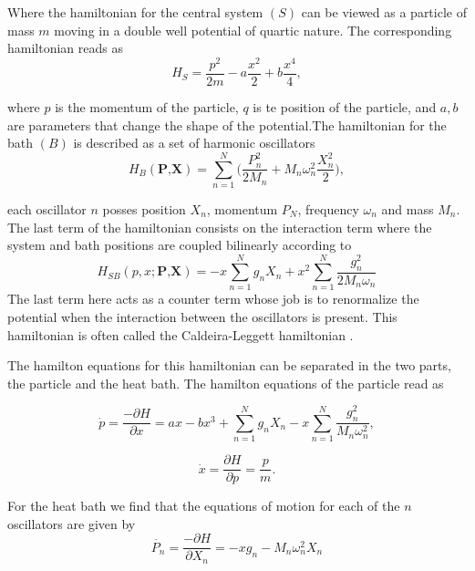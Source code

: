 Where the hamiltonian for the central system $(S)$ can be viewed as a particle of mass $m$ moving in a double well potential of quartic nature. The corresponding hamiltonian reads as
\begin{equation}
H_{S}=\frac{p^2}{2m}-a\frac{x^2}{2}+b\frac{x^4}{4},
\label{eq:particle_hamiltonian}
\end{equation}

where $p$ is the momentum of the particle, $q$ is te position of the particle, and $a,b$ are parameters that change the shape of the potential.The hamiltonian for the bath $(B)$ is described as a set of harmonic oscillators
\begin{equation}
H_B(\textbf{P,X})= \sum_{n=1}^N \Big(\frac{P_n^2}{2M_n}+M_n \omega_n^2\frac{X_n^2}{2} \Big),
\label{eq:bath_hamiltonian}
\end{equation}

each oscillator $n$ posses position $X_n$, momentum $P_N$, frequency $\omega_n$ and mass $M_n$. The last term of the hamiltonian consists on the interaction term where the system and bath positions are coupled bilinearly according to
\begin{equation}
H_{SB}(p,x;\textbf{P,X})=-x\sum_{n=1}^N g_n X_n+x^2 \sum_{n=1}^N\frac{g_n^2}{2M_n \omega_n}
\label{eq:interaction_hamiltonian}
\end{equation}
The last term here acts as a counter term whose job is to renormalize the potential when the interaction between the oscillators is present. This hamiltonian is often called the Caldeira-Leggett hamiltonian \cite{caldeira1981influence}.\par 

The hamilton equations for this hamiltonian can be separated in the two parts, the particle and the heat bath. The hamilton equations of the particle read as

\begin{equation}
\dot{p}=\frac{-\partial H}{\partial x}=ax-bx^3+\sum_{n=1}^N g_n X_n-x\sum_{n=1}^N \frac{g_n^2}{M_n \omega_n^2},
\end{equation}

\begin{equation}
\dot{x}=\frac{\partial H}{\partial p}=\frac{p}{m}.
\end{equation}

For the heat bath we find that the equations of motion for each of the $n$ oscillators are given by
\begin{equation}
\dot{P_n}=\frac{-\partial H}{\partial X_n}=-xg_n-M_n \omega _n ^2 X_n
\end{equation}

